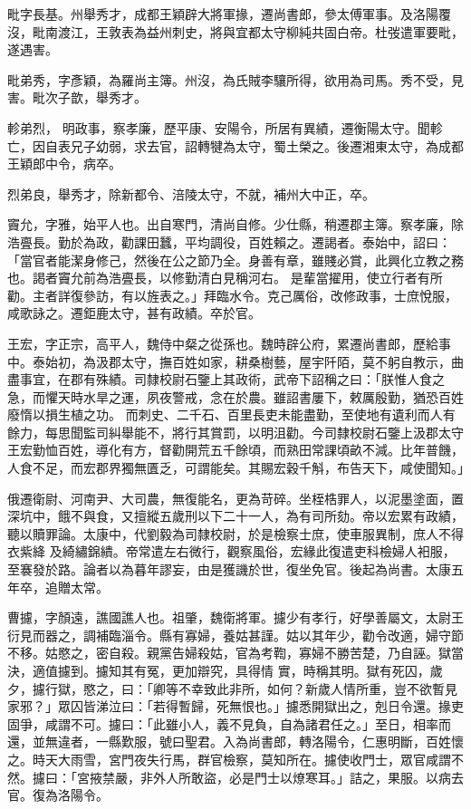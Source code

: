 \begin{pinyinscope}
 毗字長基。州舉秀才，成都王穎辟大將軍掾，遷尚書郎，參太傅軍事。及洛陽覆沒，毗南渡江，王敦表為益州刺史，將與宜都太守柳純共固白帝。杜弢遣軍要毗，遂遇害。



 毗弟秀，字彥穎，為羅尚主簿。州沒，為氏賊李驤所得，欲用為司馬。秀不受，見害。毗次子歆，舉秀才。



 軫弟烈，
 明政事，察孝廉，歷平康、安陽令，所居有異績，遷衡陽太守。聞軫亡，因自表兄子幼弱，求去官，詔轉犍為太守，蜀土榮之。後遷湘東太守，為成都王穎郎中令，病卒。



 烈弟良，舉秀才，除新都令、涪陵太守，不就，補州大中正，卒。



 竇允，字雅，始平人也。出自寒門，清尚自修。少仕縣，稍遷郡主簿。察孝廉，除浩亹長。勤於為政，勸課田蠶，平均調役，百姓賴之。遷謁者。泰始中，詔曰：「當官者能潔身修己，然後在公之節乃全。身善有章，雖賤必賞，此興化立教之務也。謁者竇允前為浩亹長，以修勤清白見稱河右。
 是輩當擢用，使立行者有所勸。主者詳復參訪，有以旌表之。」拜臨水令。克己厲俗，改修政事，士庶悅服，咸歌詠之。遷鉅鹿太守，甚有政績。卒於官。



 王宏，字正宗，高平人，魏侍中粲之從孫也。魏時辟公府，累遷尚書郎，歷給事中。泰始初，為汲郡太守，撫百姓如家，耕桑樹藝，屋宇阡陌，莫不躬自教示，曲盡事宜，在郡有殊績。司隸校尉石鑒上其政術，武帝下詔稱之曰：「朕惟人食之急，而懼天時水旱之運，夙夜警戒，念在於農。雖詔書屢下，敕厲殷勤，猶恐百姓廢惰以損生植之功。
 而刺史、二千石、百里長吏未能盡勤，至使地有遺利而人有餘力，每思聞監司糾舉能不，將行其賞罰，以明沮勸。今司隸校尉石鑒上汲郡太守王宏勤恤百姓，導化有方，督勸開荒五千餘頃，而熟田常課頃畝不減。比年普饑，人食不足，而宏郡界獨無匱乏，可謂能矣。其賜宏穀千斛，布告天下，咸使聞知。」



 俄遷衛尉、河南尹、大司農，無復能名，更為苛碎。坐桎梏罪人，以泥墨塗面，置深坑中，餓不與食，又擅縱五歲刑以下二十一人，為有司所劾。帝以宏累有政績，聽以贖罪論。太康中，代劉毅為司隸校尉，於是檢察士庶，使車服異制，庶人不得衣紫絳
 及綺繡錦繢。帝常遣左右微行，觀察風俗，宏緣此復遣吏科檢婦人衵服，至褰發於路。論者以為暮年謬妄，由是獲譏於世，復坐免官。後起為尚書。太康五年卒，追贈太常。



 曹攄，字顏遠，譙國譙人也。祖肇，魏衛將軍。攄少有孝行，好學善屬文，太尉王衍見而器之，調補臨淄令。縣有寡婦，養姑甚謹。姑以其年少，勸令改適，婦守節不移。姑愍之，密自殺。親黨告婦殺姑，官為考鞫，寡婦不勝苦楚，乃自誣。獄當決，適值攄到。攄知其有冤，更加辯究，具得情
 實，時稱其明。獄有死囚，歲夕，攄行獄，愍之，曰：「卿等不幸致此非所，如何？新歲人情所重，豈不欲暫見家邪？」眾囚皆涕泣曰：「若得暫歸，死無恨也。」攄悉開獄出之，剋日令還。掾吏固爭，咸謂不可。攄曰：「此雖小人，義不見負，自為諸君任之。」至日，相率而還，並無違者，一縣歎服，號曰聖君。入為尚書郎，轉洛陽令，仁惠明斷，百姓懷之。時天大雨雪，宮門夜失行馬，群官檢察，莫知所在。攄使收門士，眾官咸謂不然。攄曰：「宮掖禁嚴，非外人所敢盜，必是門士以燎寒耳。」詰之，果服。以病去官。復為洛陽令。




\end{pinyinscope}

